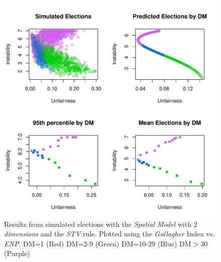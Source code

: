 \documentclass{article}
\begin{document}
\begin{figure}[]
\includegraphics[scale=1.00]{images/spatial2large_gallagher_enp.pdf}
\caption{Results from simulated elections with the \emph{Spatial Model} with \emph{$2$ dimensions} and the \emph{STV} rule. Plotted using the \emph{Gallagher} Index vs. \emph{ENP}. DM=1 (Red) DM=2-9 (Green) DM=10-29 (Blue) DM$>$30 (Purple)}
\label{fig:stv_spatial2}
\end{figure}
\end{document}
